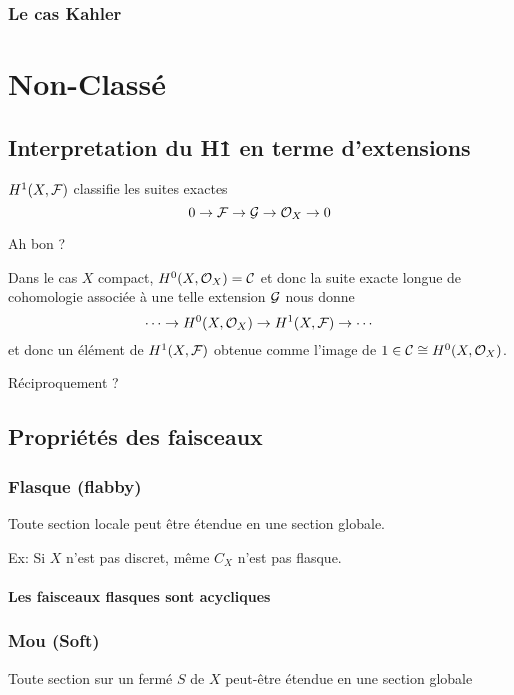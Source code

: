 \subsection{Le cas Kahler}

\chapter{Non-Classé}

\section{Interpretation du H\^1 en terme d'extensions}
$H^1(X,\mathcal{F})$ classifie les suites exactes
\begin{equation}
0 \rightarrow \mathcal{F} \rightarrow \mathcal{G} \rightarrow \mathcal{O}_X \rightarrow 0
\end{equation}

Ah bon ?

Dans le cas $X$ compact, $H^0(X,\mathcal{O}_X) = \mathcal{C}$ et donc la suite exacte longue de cohomologie associée à une telle extension $\mathcal{G}$ nous donne
\begin{equation}
\cdots \rightarrow H^0(X,\mathcal{O}_X) \rightarrow H^1(X,\mathcal{F}) \rightarrow \cdots
\end{equation}
et donc un élément de $H^1(X,\mathcal{F})$ obtenue comme l'image de $1 \in \mathcal{C} \cong H^0(X,\mathcal{O}_X)$.

Réciproquement ?


\section{Propriétés des faisceaux}

\subsection{Flasque (flabby)}
Toute section locale peut être étendue en une section globale.

Ex: Si $X$ n'est pas discret, même $C_X$ n'est pas flasque.

\subsubsection{Les faisceaux flasques sont acycliques}

\subsection{Mou (Soft)}
Toute section sur un fermé $S$ de $X$ peut-être étendue en une section globale

